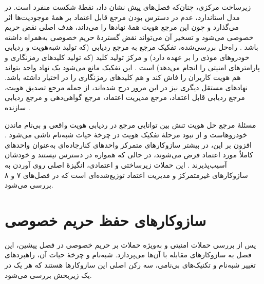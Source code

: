 \documentclass[12pt,a4paper]{article}
\begin{document}
زیرساخت مرکزی، چنان‌که فصل‌های پیش نشان داد، نقطهٔ شکست منفرد  است. در مدل استاندارد، عدم در دسترس بودن مرجع قابل اعتماد بر همهٔ موجودیت‌ها اثر می‌گذارد و چون این مرجع هویت همهٔ نهاد‌ها را می‌داند، هدف اصلی نقض حریم خصوصی می‌شود و تسخیر آن می‌تواند نقض گستردهٔ حریم خصوصی به‌همراه داشته باشد \cite{rahmawatiagustinaSystematicLiteratureReview2025}. راه‌حل بررسی‌شده، تفکیک مرجع به مرجع ردیابی  (که تولید شبه‌هویت و ردیابی خودرو‌های موذی را بر عهده دارد) و مرکز تولید کلید  (که تولید کلید‌های رمزنگاری و پارامتر‌های امنیتی را انجام می‌دهد) است \cite{rahmawatiagustinaSystematicLiteratureReview2025}. این تفکیک مانع می‌شود یک نهاد واحد بتواند هم هویت کاربران را فاش کند و هم کلید‌های رمزنگاری را در اختیار داشته باشد. نهاد‌های مستقل دیگری نیز در این مرور درج شده‌اند، از جمله مرجع تصدیق هویت، مرجع ردیابی قابل اعتماد، مرجع مدیریت اعتماد، مرجع گواهی‌دهی و مرجع ردیابی سازنده \cite{rahmawatiagustinaSystematicLiteratureReview2025}.

مسئلهٔ مرجع حل هویت  تنش بین توانایی مرجع در ردیابی هویت واقعی و بی‌نام ماندن خودروهاست و از نبود مرحلهٔ تفکیک هویت در چرخهٔ حیات شبه‌نام ناشی می‌شود \cite{rahmawatiagustinaSystematicLiteratureReview2025}. افزون بر این، در بیشتر سازوکار‌های متمرکز واحد‌های کنارجاده‌ای به‌عنوان واحد‌های کاملاً مورد اعتماد فرض می‌شوند، در حالی که همواره در دسترس نیستند و خودشان آسیب‌پذیرند \cite{farsimadanReviewSecurityChallenges2025}. این حملات زیرساختی و اعتمادی، انگیزهٔ اصلی روی آوردن به سازوکار‌های غیرمتمرکز و مدیریت اعتماد توزیع‌شده‌ای است که در فصل‌های ۷ و ۸ بررسی می‌شود.


\section{سازوکار‌های حفظ حریم خصوصی}

پس از بررسی حملات امنیتی و به‌ویژه حملات بر حریم خصوصی در فصل پیشین، این فصل به سازوکار‌های مقابله با آن‌ها می‌پردازد. شبه‌نام و چرخهٔ حیات آن، راهبرد‌های تغییر شبه‌نام و تکنیک‌های بی‌نامی، سه رکن اصلی این سازوکار‌ها هستند که هر یک در یک زیربخش بررسی می‌شود.
\end{document}
